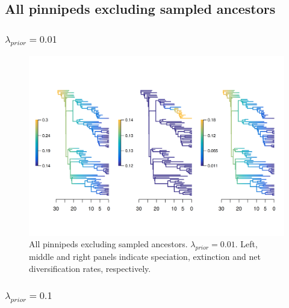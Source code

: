 \documentclass[a4paper, 12pt]{article}
\begin{document}
\subsection{All pinnipeds excluding sampled ancestors}

\subsubsection{$\lambda_{prior} = 0.01$}

\begin{figure}[H]
  \centering
  \includegraphics[width = \linewidth]{figures/diversification/sensitivity-analyses/shifts-0-01/sensitivity-analysis-noanc-0-01.png}
  \caption{All pinnipeds excluding sampled ancestors. $\lambda_{prior} = 0.01$. Left, middle and right panels indicate speciation, extinction and net diversification rates, respectively.}
  \label{fig-noanc-0-01}
\end{figure}

\subsubsection{$\lambda_{prior} = 0.1$}
\end{document}
